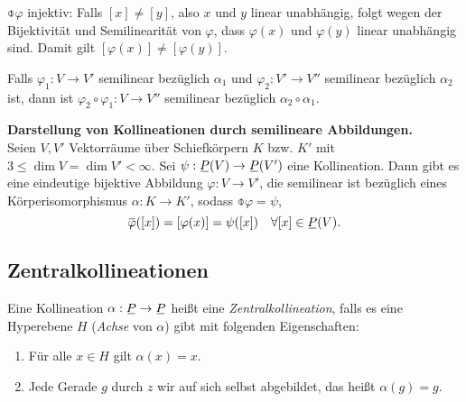 $\obar{\varphi}$ injektiv: Falls $[x] \ne [y]$, also $x$ und $y$ linear unabhängig, folgt wegen der Bijektivität und Semilinearität von $\varphi$, dass $\varphi(x)$ und $\varphi(y)$ linear unabhängig sind. Damit gilt $[\varphi(x)] \ne [\varphi(y)]$.

\begin{rmrk*}
 Falls $\varphi_1 : V \to V'$ semilinear bezüglich $\alpha_1$ und $\varphi_2: V' \to V''$ semilinear bezüglich $\alpha_2$ ist, dann ist $\varphi_2 \circ \varphi_1: V \to V''$ semilinear bezüglich $\alpha_2 \circ \alpha_1$.
\end{rmrk*}

\begin{thm}
 \textbf{Darstellung von Kollineationen durch semilineare Abbildungen.} \\
 Seien $V, V'$ Vektorräume über Schiefkörpern $K$ bzw. $K'$ mit $3 \le \dim V = \dim V' < \infty$. Sei $\psi: \proj(V) \to \proj(V')$ eine Kollineation. Dann gibt es eine eindeutige bijektive Abbildung $\varphi: V \to V'$, die semilinear ist bezüglich eines Körperisomorphismus $\alpha: K \to K'$, sodass $\obar{\varphi} = \psi$,
 \[ \obar{\varphi}([x]) = [\varphi(x)] = \psi( [x] ) \quad \forall [x] \in \proj(V). \]
\end{thm}

\subsection{Zentralkollineationen}
\begin{defn*}
 Eine Kollineation $\alpha: \proj \to \proj$ heißt eine \emph{Zentralkollineation}, falls es eine Hyperebene $H$ (\emph{Achse} von $\alpha$) gibt mit folgenden Eigenschaften:
 \begin{enumerate}
  \item Für alle $x \in H$ gilt $\alpha(x) = x$.
  \item Jede Gerade $g$ durch $z$ wir auf sich selbst abgebildet, das heißt $\alpha(g) = g$.
 \end{enumerate}
\end{defn*}

